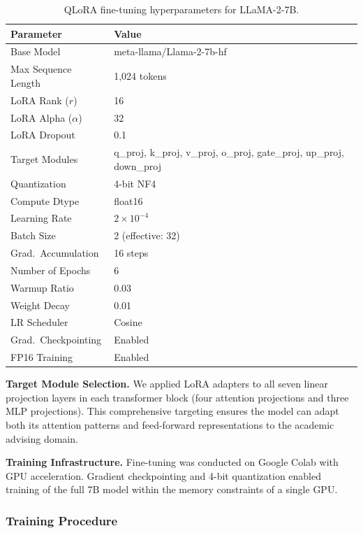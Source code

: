 \documentclass[conference,compsoc]{IEEEtran}
\begin{document}
\begin{table}[htbp]
\centering
\caption{QLoRA fine-tuning hyperparameters for LLaMA-2-7B.}
\label{tab:qlora_config}
\small
\begin{tabularx}{\columnwidth}{L{3.2cm}X}
\toprule
\textbf{Parameter} & \textbf{Value} \\
\midrule
Base Model & meta-llama/Llama-2-7b-hf \\
Max Sequence Length & 1,024 tokens \\
LoRA Rank ($r$) & 16 \\
LoRA Alpha ($\alpha$) & 32 \\
LoRA Dropout & 0.1 \\
Target Modules & q\_proj, k\_proj, v\_proj, o\_proj, gate\_proj, up\_proj, down\_proj \\
Quantization & 4-bit NF4 \\
Compute Dtype & float16 \\
Learning Rate & $2 \times 10^{-4}$ \\
Batch Size & 2 (effective: 32) \\
Grad.\ Accumulation & 16 steps \\
Number of Epochs & 6 \\
Warmup Ratio & 0.03 \\
Weight Decay & 0.01 \\
LR Scheduler & Cosine \\
Grad.\ Checkpointing & Enabled \\
FP16 Training & Enabled \\
\bottomrule
\end{tabularx}
\end{table}

\textbf{Target Module Selection.}
We applied LoRA adapters to all seven linear projection layers in each transformer block (four attention projections and three MLP projections). This comprehensive targeting ensures the model can adapt both its attention patterns and feed-forward representations to the academic advising domain.

\textbf{Training Infrastructure.}
Fine-tuning was conducted on Google Colab with GPU acceleration. Gradient checkpointing and 4-bit quantization enabled training of the full 7B model within the memory constraints of a single GPU.

\subsubsection{Training Procedure}
\end{document}

